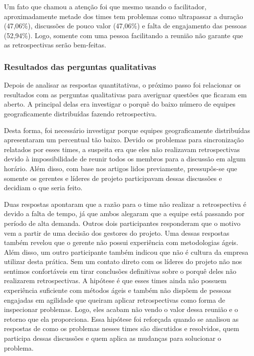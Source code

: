 Um fato que chamou a atenção foi que mesmo usando o facilitador, aproximadamente metade dos times tem problemas como ultrapassar a duração (47,06\%), discussões de pouco valor (47,06\%) e falta de engajamento das pessoas (52,94\%). Logo, somente com uma pessoa facilitando a reunião não garante que as retrospectivas serão bem-feitas.

\subsubsection*{Resultados das perguntas qualitativas}

Depois de analisar as respostas quantitativas, o próximo passo foi relacionar os resultados com as perguntas qualitativas para averiguar questões que ficaram em aberto. A principal delas era investigar o porquê do baixo número de equipes geograficamente distribuídas fazendo retrospectiva.
  
Desta forma, foi necessário investigar porque equipes geograficamente distribuídas apresentaram um percentual tão baixo. Devido os problemas para sincronização relatados por esses times, a suspeita era que eles não realizavam retrospectivas devido à impossibilidade de reunir todos os membros para a discussão em algum horário. Além disso, com base nos artigos lidos previamente, pressupôs-se que somente os gerentes e líderes de projeto participavam dessas discussões e decidiam o que seria feito.

Duas respostas apontaram que a razão para o time não realizar a retrospectiva é devido a falta de tempo, já que ambos alegaram que a equipe está passando por período de alta demanda. Outros dois participantes responderam que o motivo vem a partir de uma decisão dos gestores do projeto. Uma dessas respostas também revelou que o gerente não possui experiência com metodologias ágeis. Além disso, um outro participante também indicou que não é cultura da empresa utilizar desta prática. Sem um contato direto com os líderes do projeto não nos sentimos confortáveis em tirar conclusões definitivas sobre o porquê deles não realizarem retrospectivas. A hipótese é que esses times ainda não possuem experiência suficiente com métodos ágeis e também não dispõem de pessoas engajadas em agilidade que queiram aplicar retrospectivas como forma de inspecionar problemas. Logo, eles acabam não vendo o valor dessa reunião e o retorno que ela proporciona. Essa hipótese foi reforçada quando se analisou as respostas de como os problemas nesses times são discutidos e resolvidos, quem participa dessas discussões e quem aplica as mudanças para solucionar o problema.

